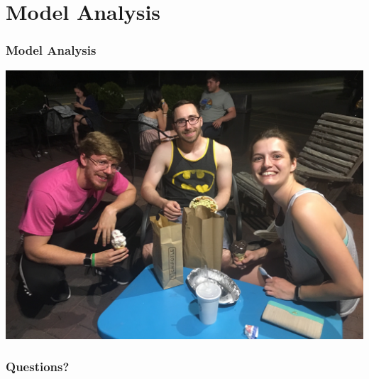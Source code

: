\documentclass[11pt]{beamer}
\begin{document}
\section{Model Analysis}
\begin{frame}
\frametitle{{\textbf{\huge Model Analysis}}}
\end{frame}
\begin{frame}
\begin{center}
	\includegraphics[scale=0.05]{questions.jpg} 
\end{center}
\frametitle{{\textbf{\huge Questions?}}}
\end{frame}
\end{document}
